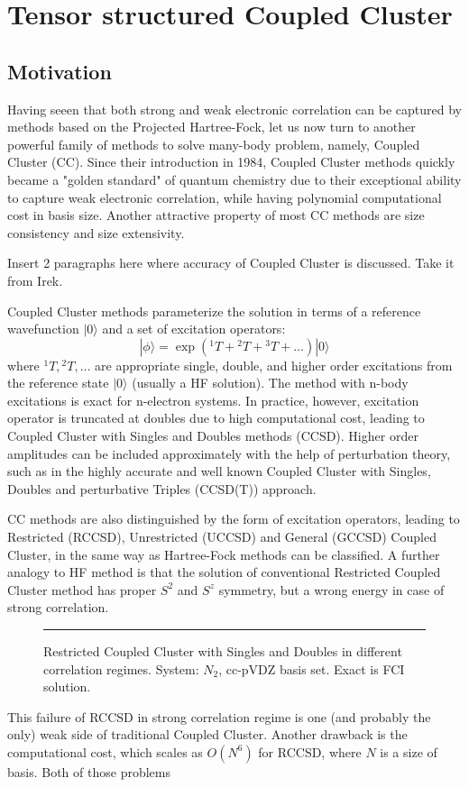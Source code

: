\chapter{Tensor structured Coupled Cluster}
\label{ch:tcc} 


\section{Motivation}
\label{sec:Introduction} 
Having seeen that both strong and weak electronic correlation can be captured 
by methods based on the Projected Hartree-Fock, let us now turn to another 
powerful family of methods to solve many-body problem, namely, Coupled Cluster 
(CC). Since their introduction in 1984,\cite{} Coupled Cluster methods quickly 
became a "golden standard" of quantum chemistry due to their exceptional 
 ability to capture weak electronic correlation, while having polynomial 
computational cost in basis size. Another attractive property of most CC 
methods are size consistency and size extensivity.\cite{} 

{\color{red} Insert 2 paragraphs here where accuracy of Coupled Cluster is 
discussed. Take it from Irek.}

Coupled Cluster methods parameterize the solution in terms of a reference 
wavefunction $| 0 \rangle$ and a set of excitation operators:
\begin{equation}
 | \phi \rangle  = \exp({}^1T + {}^2T + {}^3T + \ldots) | 0 \rangle
\end{equation}
where ${}^1T, {}^2T, \ldots$ are appropriate single, double, and higher order 
excitations from the reference state $| 0 \rangle$ (usually a HF solution). The 
method with n-body excitations is exact for n-electron systems. In 
practice, however, excitation operator is truncated at doubles due to high 
computational cost, leading to Coupled Cluster with Singles and Doubles methods 
(CCSD).\cite{} Higher order amplitudes can be included approximately
with the help of perturbation theory, such as in the highly accurate and 
well known Coupled Cluster with Singles, Doubles and perturbative 
Triples (CCSD(T)) approach.\cite{}

CC methods are also distinguished by the form of excitation operators, 
leading to Restricted (RCCSD), Unrestricted (UCCSD) and General (GCCSD) 
Coupled Cluster, in the same way as Hartree-Fock methods can be classified. 
A further analogy to HF method is that the solution of conventional Restricted 
Coupled Cluster method has proper $S^{2}$ and $S^{z}$ symmetry, but a wrong 
energy in case of strong correlation.

\begin{figure}[!ht]
\centering
 \rule{0.8\textwidth}{2cm}
 \caption{Restricted Coupled Cluster with Singles and Doubles in different 
correlation regimes. System: $N_{2}$, cc-pVDZ basis set. Exact is FCI solution.}
\end{figure}

This failure of RCCSD in strong correlation regime is one (and probably the 
only) weak side of traditional Coupled Cluster. Another drawback is the 
computational cost, which scales as $O(N^6)$ for RCCSD, where $N$ is a 
size of basis. Both of those problems 
